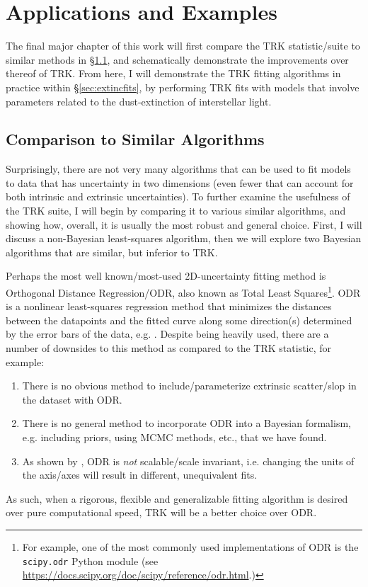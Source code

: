 \chapter{Applications and Examples}
\label{cha:applic}
The final major chapter of this work will first compare the TRK statistic/suite to similar methods in \S\ref{sec:compare}, and schematically demonstrate the improvements over thereof of TRK. From here, I will demonstrate the TRK fitting algorithms in practice within \S\ref{sec:extincfits}, by performing TRK fits with models that involve parameters related to the dust-extinction of interstellar light.
\section{Comparison to Similar Algorithms}
\label{sec:compare}
Surprisingly, there are not very many algorithms that can be used to fit models to data that has uncertainty in two dimensions (even fewer that can account for both intrinsic and extrinsic uncertainties). To further examine the usefulness of the TRK suite, I will begin by comparing it to various similar algorithms, and showing how, overall, it is usually the most robust and general choice. First, I will discuss a non-Bayesian least-squares algorithm, then we will explore two Bayesian algorithms that are similar, but inferior to TRK.

Perhaps the most well known/most-used 2D-uncertainty fitting method is Orthogonal Distance Regression/ODR, also known as Total Least Squares\footnote{For example, one of the most commonly used implementations of ODR is the \texttt{scipy.odr} Python module (see \url{https://docs.scipy.org/doc/scipy/reference/odr.html}.)}. ODR is a nonlinear least-squares regression method that minimizes the distances between the datapoints and the fitted curve along some direction(s) determined by the error bars of the data, e.g. \textcite{brown1990odr}. Despite being heavily used, there are a number of downsides to this method as compared to the TRK statistic, for example:
\begin{enumerate}
    \item There is no obvious method to include/parameterize extrinsic scatter/slop in the dataset with ODR.
    \item There is no general method to incorporate ODR into a Bayesian formalism, e.g. including priors, using MCMC methods, etc., that we have found.
    \item As shown by \textcite{odrscale}, ODR is \textit{not} scalable/scale invariant, i.e. changing the units of the axis/axes will result in different, unequivalent fits.
\end{enumerate}
As such, when a rigorous, flexible and generalizable fitting algorithm is desired over pure computational speed, TRK will be a better choice over ODR.

